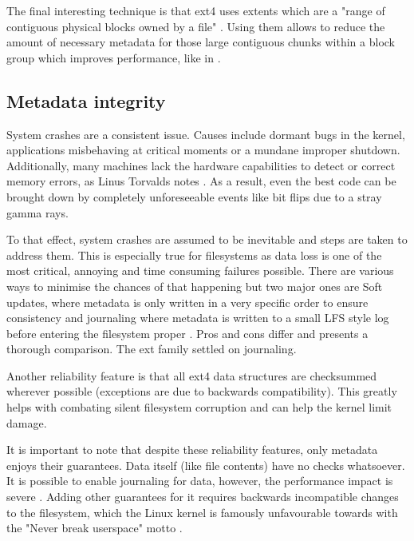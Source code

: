             The final interesting technique is that ext4 uses extents which are
            a "range of contiguous physical blocks owned by a file"
            \cite{ext4_space_maps}. Using them allows to reduce the amount of
            necessary metadata for those large contiguous chunks within a block
            group which improves performance, like in .

        \subsection{Metadata integrity}

            System crashes are a consistent issue. Causes include dormant bugs
            in the kernel, applications misbehaving at critical moments or a
            mundane improper shutdown. Additionally, many machines lack the
            hardware capabilities to detect or correct memory errors, as Linus
            Torvalds notes \cite{Linus_ECC_rant}. As a result, even the best
            code can be brought down by completely unforeseeable events like bit
            flips due to a stray gamma rays.

            To that effect, system crashes are assumed to be inevitable and
            steps are taken to address them. This is especially true for
            filesystems as data loss is one of the most critical, annoying and
            time consuming failures possible. There are various ways to
            minimise the chances of that happening but two major ones are Soft
            updates, where metadata is only written in a very specific order to
            ensure consistency \cite{soft_updates} and journaling where
            metadata is written to a small LFS style log before entering the
            filesystem proper \cite{ext4_docs}. Pros and cons differ and
             presents a thorough
            comparison. The ext family settled on journaling.

            Another reliability feature is that all ext4 data structures are
            checksummed wherever possible (exceptions are due to backwards
            compatibility). This greatly helps with combating silent
            filesystem corruption and can help the kernel limit damage.

            It is important to note that despite these reliability features,
            only metadata enjoys their guarantees. Data itself (like file
            contents) have no checks whatsoever. It is possible to enable
            journaling for data, however, the performance impact is severe
            \cite{ext4_docs}. Adding other guarantees for it requires backwards
            incompatible changes to the filesystem, which the Linux kernel is
            famously unfavourable towards with the "Never break userspace"
            motto \cite{never_break_userspace}.

